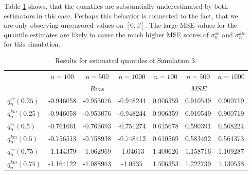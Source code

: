 %
\clearpage
Table \ref{tab:res_exppar2} shows, that the quantiles are substantially underestimated by both estimators in this case. Perhaps this behavior is connected to the fact, that we are only observing uncensored values on $[0,\beta]$. The large MSE values for the quantile estimates are likely to cause the much higher MSE scores of $\sigma_n^{se}$ and $\sigma_n^{km}$ for this simulation.
\begin{table}[h!]
	\begin{center}
		
		\begin{tabular}{| l || c | c | c || c | c | c |}
			\hline
			&       $n=100$   &    $n=500$    &    $n=1000$ &       $n=100$   &    $n=500$    &    $n=1000$\\
			\cline{2-7}
			& \multicolumn{3}{c||}{$Bias$} &\multicolumn{3}{c|}{$MSE$}\\
			\hline
			\hline
			$q^{se}_n(0.25)$ & -0.946058 & -0.953076 & -0.948244& 0.906359 & 0.910549 & 0.900719\\
			$q^{km}_n(0.25)$ & -0.946058 & -0.953076 & -0.948244& 0.906359 & 0.910549 & 0.900719\\
			\hline
			$q^{se}_n(0.5)$ & -0.761661 & -0.763693 & -0.751274& 0.615678 & 0.590391 & 0.568224\\
			$q^{km}_n(0.5)$ & -0.756513 & -0.758938 & -0.748412 & 0.610569 & 0.583492 & 0.564373\\
			\hline
			$q^{se}_n(0.75)$ & -1.144379 & -1.062969 & -1.04613 & 1.400626 & 1.158716 & 1.109287\\
			$q^{km}_n(0.75)$ & -1.164122 & -1.088963 & -1.0535 & 1.506353 & 1.222739 & 1.130558\\
			\hline
		\end{tabular}
	\end{center}
	\caption{Results for estimated quantiles of Simulation 3.}
	\label{tab:res_exppar2}
\end{table}

